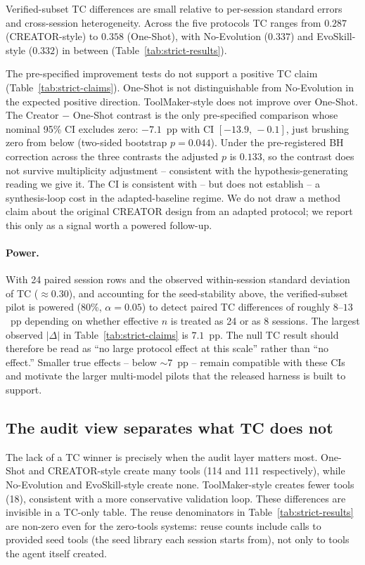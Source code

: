 \documentclass[sigconf,anonymous,natbib=false]{acmart}
\begin{document}
Verified-subset TC differences are small relative to per-session standard errors and cross-session heterogeneity. Across the five protocols TC ranges from $0.287$ (CREATOR-style) to $0.358$ (One-Shot), with No-Evolution ($0.337$) and EvoSkill-style ($0.332$) in between (Table~\ref{tab:strict-results}).

The pre-specified improvement tests do not support a positive TC claim (Table~\ref{tab:strict-claims}). One-Shot is not distinguishable from No-Evolution in the expected positive direction. ToolMaker-style does not improve over One-Shot. The Creator $-$ One-Shot contrast is the only pre-specified comparison whose nominal 95\% CI excludes zero: $-7.1$~pp with CI $[-13.9,\,-0.1]$, just brushing zero from below (two-sided bootstrap $p{=}0.044$). Under the pre-registered BH correction across the three contrasts the adjusted $p$ is $0.133$, so the contrast does not survive multiplicity adjustment -- consistent with the hypothesis-generating reading we give it. The CI is consistent with -- but does not establish -- a synthesis-loop cost in the adapted-baseline regime. We do not draw a method claim about the original CREATOR design from an adapted protocol; we report this only as a signal worth a powered follow-up.



\paragraph{Power.} With 24 paired session rows and the observed within-session standard deviation of TC ($\approx 0.30$), and accounting for the seed-stability above, the verified-subset pilot is powered (80\%, $\alpha{=}0.05$) to detect paired TC differences of roughly $8$--$13$~pp depending on whether effective $n$ is treated as 24 or as 8 sessions. The largest observed $|\Delta|$ in Table~\ref{tab:strict-claims} is $7.1$~pp. The null TC result should therefore be read as ``no large protocol effect at this scale'' rather than ``no effect.'' Smaller true effects -- below $\sim 7$~pp -- remain compatible with these CIs and motivate the larger multi-model pilots that the released harness is built to support.

\subsection{The audit view separates what TC does not}

The lack of a TC winner is precisely when the audit layer matters most. One-Shot and CREATOR-style create many tools (114 and 111 respectively), while No-Evolution and EvoSkill-style create none. ToolMaker-style creates fewer tools (18), consistent with a more conservative validation loop. These differences are invisible in a TC-only table. The reuse denominators in Table~\ref{tab:strict-results} are non-zero even for the zero-tools systems: reuse counts include calls to provided seed tools (the seed library each session starts from), not only to tools the agent itself created.
\end{document}

